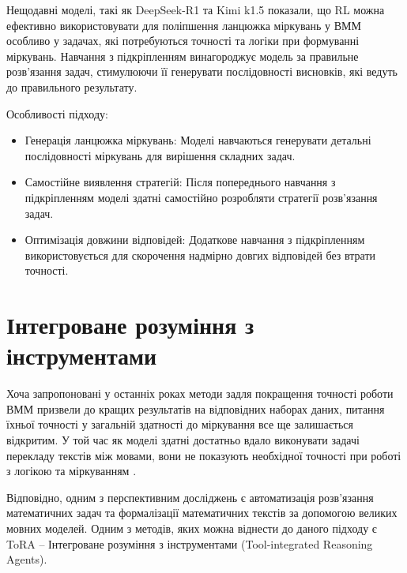 Нещодавні моделі, такі як DeepSeek-R1 \cite{deepseekai2025deepseekr1incentivizingreasoningcapability} та Kimi k1.5 \cite{kimiteam2025kimik15scalingreinforcement} показали, що RL можна ефективно використовувати для поліпшення ланцюжка міркувань у ВММ особливо у задачах, які потребуються точності та логіки при формуванні міркувань. Навчання з підкріпленням винагороджує модель за правильне розв'язання задач, стимулюючи її генерувати послідовності висновків, які ведуть до правильного результату.

Особливості підходу:

\begin{itemize}
    \item {Генерація ланцюжка міркувань}: Моделі навчаються генерувати детальні послідовності міркувань для вирішення складних задач.
    \item {Самостійне виявлення стратегій}: Після попереднього навчання з підкріпленням моделі здатні самостійно розробляти стратегії розв'язання задач.
    \item {Оптимізація довжини відповідей}: Додаткове навчання з підкріпленням використовується для скорочення надмірно довгих відповідей без втрати точності.
\end{itemize}

\section{Інтегроване розуміння з інструментами}

Хоча запропоновані у останніх роках методи задля покращення точності роботи ВММ призвели до кращих результатів на відповідних наборах даних, питання їхньої точності у загальній здатності до міркування все ще залишається відкритим. У той час як моделі здатні достатньо вдало виконувати задачі перекладу текстів між мовами, вони не показують необхідної точності при роботі з логікою та міркуванням \cite{bubeck2023sparksartificialgeneralintelligence}.

Відповідно, одним з перспективним досліджень є автоматизація розв'язання математичних задач та формалізації математичних текстів за допомогою великих мовних моделей. Одним з методів, яких можна віднести до даного підходу є ToRA -- Інтегроване розуміння з інструментами (Tool-integrated Reasoning Agents).

